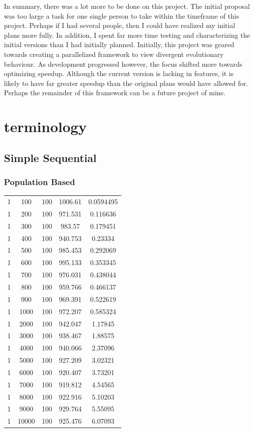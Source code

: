 \documentclass[10pt,letterpaper]{article}
\begin{document}
In summary, there was a lot more to be done on this project. The initial proposal was too large a task for one single person to take within the timeframe of this project. Perhaps if I had several people, then I could have realized my initial plans more fully. In addition, I spent far more time testing and characterizing the initial versions than I had initially planned. Initially, this project was geared towards creating a parallelized framework to view divergent evolutionary behaviour. As development progressed however, the focus shifted more towards optimizing speedup. Although the current version is lacking in features, it is likely to have far greater speedup than the original plans would have allowed for. Perhaps the remainder of this framework can be a future project of mine.


\section{terminology}

\subsection{Simple Sequential}
\subsubsection{Population Based}
\begin{tabular}{ c | c | c | c | c }
 1 & 100 & 100 & 1006.61 & 0.0594495 \\
 1 & 200 & 100 & 971.531 & 0.116636 \\
 1 & 300 & 100 & 983.57 & 0.179451 \\
 1 & 400 & 100 & 940.753 & 0.23334 \\
 1 & 500 & 100 & 985.453 & 0.292069 \\
 1 & 600 & 100 & 995.133 & 0.353345 \\
 1 & 700 & 100 & 976.031 & 0.438044 \\ 
 1 & 800 & 100 & 959.766 & 0.466137 \\   
 1 & 900 & 100 & 969.391 & 0.522619 \\
 1 & 1000 & 100 & 972.207 & 0.585324 \\
 1 & 2000 & 100 & 942.047 & 1.17845  \\
 1 & 3000 & 100 & 938.467 & 1.88575 \\
 1 & 4000 & 100 & 940.066 & 2.37096 \\
 1 & 5000 & 100 & 927.209 & 3.02321 \\
 1 & 6000 & 100 & 920.407 & 3.73201 \\
 1 & 7000 & 100 & 919.812 & 4.54565 \\
 1 & 8000 & 100 & 922.916 & 5.10203 \\
 1 & 9000 & 100 & 929.764 & 5.55095 \\
 1 & 10000 & 100 & 925.476 & 6.07093 \\
\end{tabular}
\end{document}
